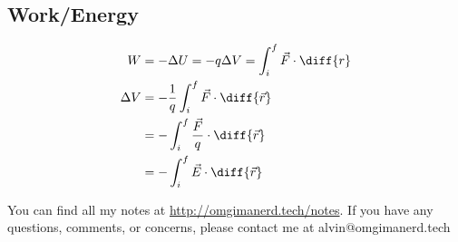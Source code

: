\documentclass{math}
\begin{document}
\subsection*{Work/Energy}
\begin{align*}
  W &= -\Delta U = -q\Delta V = \int_{i}^{f}\vec{F}\cdot\diff{r} \\
  \Delta V &= -\frac{1}{q}\int_{i}^{f}\vec{F}\cdot\diff{\vec{r}} \\
  &= -\int_{i}^{f}\frac{\vec{F}}{q}\cdot\diff{\vec{r}} \\
  &= -\int_{i}^{f}\vec{E}\cdot\diff{\vec{r}}
\end{align*}

\begin{center}
  You can find all my notes at \url{http://omgimanerd.tech/notes}. If you have
  any questions, comments, or concerns, please contact me at
  alvin@omgimanerd.tech
\end{center}
\end{document}
